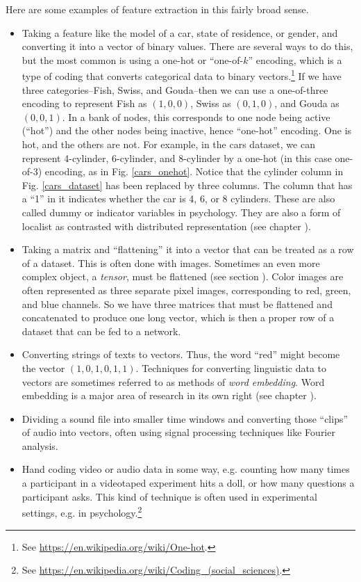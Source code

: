 Here are some examples of feature extraction in this fairly broad sense. 
\begin{itemize}
\item Taking a feature like the model of a car, state of residence, or gender, and converting it into a vector of binary values. There are several ways to do this, but the most common is using a one-hot or ``one-of-$k$'' encoding, which is a type of coding that converts categorical data to binary vectors.\footnote{See \url{https://en.wikipedia.org/wiki/One-hot}.} If we have three categories--Fish, Swiss, and Gouda--then we can use a one-of-three encoding to represent Fish as $(1,0,0)$, Swiss as $(0,1,0)$, and Gouda as $(0,0,1)$. In a bank of nodes, this corresponds to one node being active (``hot'') and the other nodes being inactive, hence ``one-hot'' encoding. One is hot, and the others are not. For example, in the cars dataset, we can represent 4-cylinder, 6-cylinder, and 8-cylinder by a one-hot (in this case one-of-3) encoding, as in Fig. \ref{cars_onehot}. Notice that the cylinder column in Fig. \ref{cars_dataset} has been  replaced by three columns. The column that has a ``1'' in it indicates whether the car is 4, 6, or 8 cylinders. These are also called dummy or indicator variables in psychology. They are also a form of localist as contrasted with distributed representation (see chapter ).
\item Taking a matrix and ``flattening'' it into a vector that can be treated as a row of a dataset. This is often done with images. Sometimes an even more complex object, a \emph{tensor}, must be flattened (see section ). Color images are often represented as three separate pixel  images, corresponding to red, green, and blue channels. So we have three matrices that must be flattened and concatenated to produce one long vector, which is then a proper row of a dataset that can be fed to a network.
\item Converting strings of texts to vectors. Thus, the word ``red'' might become the vector $(1,0,1,0,1,1)$. Techniques for converting linguistic data to vectors are sometimes referred to as methods of \emph{word embedding}. Word embedding is a major area of research in its own right (see chapter ).
\item Dividing a sound file into smaller time windows and converting those ``clips'' of audio into vectors, often using signal processing techniques like Fourier analysis.
\item Hand coding video or audio data in some way, e.g. counting how many times a participant in a videotaped experiment hits a doll, or how many questions a participant asks. This kind of technique is often used in experimental settings, e.g. in psychology.\footnote{See \url{https://en.wikipedia.org/wiki/Coding_(social_sciences)}.}
\end{itemize}

